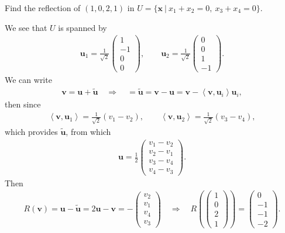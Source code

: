 \documentclass[letter-paper]{tufte-book}
\newenvironment{example}[1][Example]{\begin{trivlist}
\item[\hskip \labelsep {\bfseries #1}]}{\end{trivlist}}
\newcommand{\inner}[2]{\left\langle #1, #2\right\rangle}
\newcommand{\ub}{{\boldsymbol{u}}}
\newcommand{\vb}{{\boldsymbol{v}}}
\newcommand{\xb}{{\boldsymbol{x}}}
\begin{document}
\begin{example}
  Find the reflection of $(1, 0, 2, 1)$ in $U = \{ \xb\ |\ x_1 + x_2 = 0,\ x_3 + x_4 = 0 \}$.
  
  We see that $U$ is spanned by
  \begin{align*}
    \ub_1 = \frac{1}{\sqrt{2}}\begin{pmatrix} 1 \\ -1 \\ 0 \\ 0 \end{pmatrix}, \qquad
    \ub_2 = \frac{1}{\sqrt{2}}\begin{pmatrix} 0 \\ 0 \\ 1 \\ -1 \end{pmatrix}.
  \end{align*}
  We can write
  \begin{align*}
    \vb = \ub + \tilde{\ub} \quad \Rightarrow \quad = \tilde{\ub} = \vb - \ub = \vb - \inner{\vb}{\ub_i}\ub_i,
  \end{align*}
  then since
  \begin{align*}
    \inner{\vb}{\ub_1} = \frac{1}{\sqrt{2}}(v_1 - v_2), \qquad \inner{\vb}{\ub_2} = \frac{1}{\sqrt{2}}(v_3 - v_4),
  \end{align*}
  which provides $\tilde{\ub}$, from which
  \begin{align*}
    \ub = \frac{1}{2}\begin{pmatrix} v_1 - v_2 \\ v_2 - v_1 \\ v_3 - v_4 \\ v_4 - v_3 \end{pmatrix}.
  \end{align*}
  Then
  \begin{align*}
    R(\vb) = \ub - \tilde{\ub} = 2\ub - \vb = -\begin{pmatrix} v_2 \\ v_1 \\ v_4 \\ v_3 \end{pmatrix} \quad \Rightarrow \quad R\left(\begin{pmatrix} 1 \\ 0 \\ 2 \\ 1 \end{pmatrix}\right) = \begin{pmatrix} 0 \\ -1 \\ -1 \\ -2 \end{pmatrix}.
  \end{align*}
\end{example}
\end{document}
